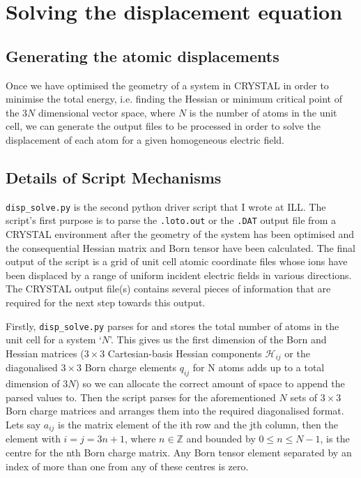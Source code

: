 \documentclass[10pt]{article}
\begin{document}
\section{Solving the displacement equation}
\subsection{Generating the atomic displacements}

Once we have optimised the geometry of a system in CRYSTAL in order to minimise the total energy, i.e. finding the Hessian or minimum critical point of the $3N$ dimensional vector space, where $N$ is the number of atoms in the unit cell, we can generate the output files to be processed in order to solve the displacement of each atom for a given homogeneous electric field. 

\subsection{Details of Script Mechanisms}

\texttt{disp\_solve.py} is the second python driver script that I wrote at ILL. The script's first purpose is to parse the \texttt{.loto.out} or the \texttt{.DAT} output file from a CRYSTAL environment after the geometry of the system has been optimised and the consequential Hessian matrix and Born tensor have been calculated. The final output of the script is a grid of unit cell atomic coordinate files whose ions have been displaced by a range of uniform incident electric fields in various directions. The CRYSTAL output file(s) contains several pieces of information that are required for the next step towards this output.

Firstly, \texttt{disp\_solve.py} parses for and stores the total number of atoms in the unit cell for a system `$N$'. This gives us the first dimension of the Born and Hessian matrices ($3\times 3$ Cartesian-basis Hessian components $\mathcal{H}_{ij}$ or the diagonalised $3\times 3$ Born charge elements $q_{ij}$ for N atoms adds up to a total dimension of $3N$) so we can allocate the correct amount of space to append the parsed values to. Then the script parses for the aforementioned $N$ sets of $3\times3$ Born charge matrices and arranges them into the required diagonalised format. Lets say $a_{ij}$ is the matrix element of the ith row and the jth column, then the element with $i = j = 3n+1$, where $n \in \mathbb{Z}$ and bounded by $0 \leq n \leq N-1$, is the centre for the nth Born charge matrix. Any Born tensor element separated by an index of more than one from any of these centres is zero.
\end{document}

